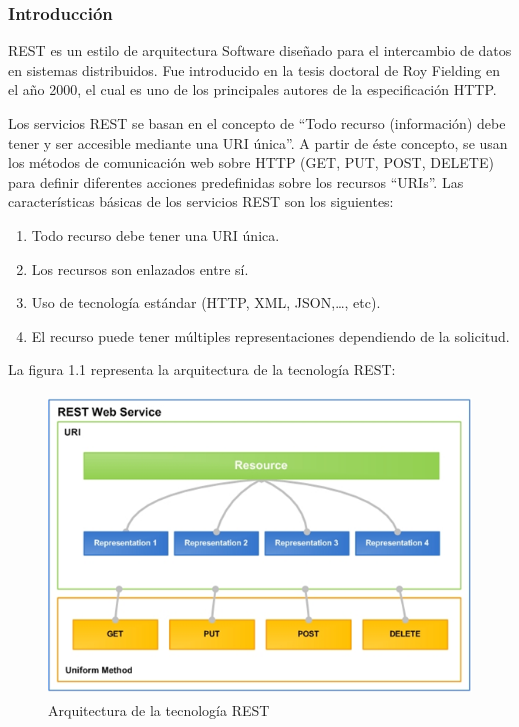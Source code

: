 \subsubsection{Introducción}
REST es un estilo de arquitectura Software diseñado para el intercambio de datos en sistemas distribuidos. Fue introducido en la tesis doctoral de Roy Fielding en el año 2000, el cual es uno de los principales autores de la especificación HTTP.
\bigskip
\par
Los servicios REST se basan en el concepto  de “Todo recurso  (información) debe tener y ser accesible mediante una URI única”. A partir de éste concepto, se usan los métodos de comunicación web sobre HTTP (GET, PUT, POST, DELETE)  para definir diferentes acciones predefinidas sobre los recursos “URIs”.
Las características básicas de los servicios REST son los siguientes:
\begin{enumerate}
\item Todo recurso debe tener una URI única.
\item Los recursos son enlazados entre sí.
\item Uso de tecnología estándar (HTTP, XML, JSON,…, etc).
\item El recurso puede tener múltiples representaciones dependiendo de la solicitud.	
\end{enumerate}
La figura 1.1 representa la arquitectura de la tecnología REST:
\begin{figure}
\begin{center}
\includegraphics[width=12cm,height=8cm]{Figuras/REST.png}
\end{center}
\caption{\label{REST} Arquitectura de la tecnología REST}
\end{figure}
